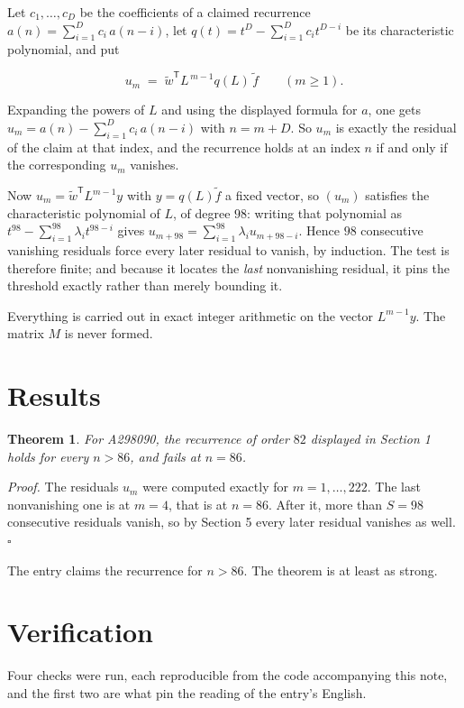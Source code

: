 \documentclass[11pt]{article}
\newtheorem{theorem}{Theorem}
\theoremstyle{definition}
\begin{document}
Let $c_1,\dots,c_D$ be the coefficients of a claimed recurrence $a(n) = \sum_{i=1}^{D} c_i\,a(n-i)$, let $q(t) = t^{D} - \sum_{i=1}^{D} c_i t^{D-i}$ be its characteristic polynomial, and put

\[u_m \;=\; \tilde w^{\mathsf T} L^{\,m-1} q(L)\,\tilde f \qquad (m \ge 1).\]

Expanding the powers of $L$ and using the displayed formula for $a$, one gets $u_m = a(n) - \sum_{i=1}^{D} c_i\,a(n-i)$ with $n = m + D$. So $u_m$ is exactly the residual of the claim at that index, and the recurrence holds at an index $n$ if and only if the corresponding $u_m$ vanishes.

Now $u_m = \tilde w^{\mathsf T} L^{m-1} y$ with $y = q(L)\tilde f$ a fixed vector, so $(u_m)$ satisfies the characteristic polynomial of $L$, of degree $98$: writing that polynomial as $t^{98} - \sum_{i=1}^{98} \lambda_i t^{98-i}$ gives $u_{m+98} = \sum_{i=1}^{98} \lambda_i u_{m+98-i}$. Hence $98$ consecutive vanishing residuals force every later residual to vanish, by induction. The test is therefore finite; and because it locates the {\itshape last} nonvanishing residual, it pins the threshold exactly rather than merely bounding it.

Everything is carried out in exact integer arithmetic on the vector $L^{m-1}y$. The matrix $M$ is never formed.

\section{Results}

\begin{theorem} For A298090, the recurrence of order $82$ displayed in Section 1 holds for every $n > 86$, and fails at $n = 86$.\end{theorem}

{\itshape Proof.} The residuals $u_m$ were computed exactly for $m = 1,\dots,222$. The last nonvanishing one is at $m = 4$, that is at $n = 86$. After it, more than $S = 98$ consecutive residuals vanish, so by Section 5 every later residual vanishes as well. $\square$

The entry claims the recurrence for $n > 86$. The theorem is at least as strong.

\section{Verification}

Four checks were run, each reproducible from the code accompanying this note, and the first two are what pin the reading of the entry's English.
\end{document}
